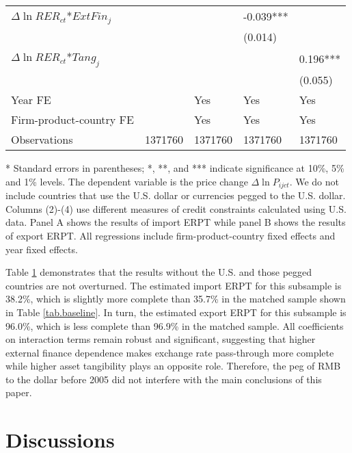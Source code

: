 \documentclass[12pt]{article}
\begin{document}
\begin{table}[htbp]
\begin{threeparttable}
\begin{tabular}{lllll}
		$\Delta \ln RER_{ct}$*$ExtFin_{j}$ &       &       & -0.039*** &  \\
		&       &       & (0.014) &  \\
		$\Delta \ln RER_{ct}$*$Tang_{j}$ &       &       &       & 0.196*** \\
		&       &       &       & (0.055) \\
		Year FE  &       & Yes   & Yes   & Yes \\
		Firm-product-country FE &       & Yes   & Yes   & Yes \\
		Observations & 1371760 & 1371760 & 1371760 & 1371760 \\
		\bottomrule
	\end{tabular}
	\begin{tablenotes}
		\footnotesize
		\item[*] Standard errors in parentheses; *, **, and *** indicate significance at 10\%, 5\% and 1\% levels. The dependent variable is the price change $\Delta \ln P_{ijct}$. We do not include countries that use the U.S. dollar or currencies pegged to the U.S. dollar. Columns (2)-(4) use different measures of credit constraints calculated using U.S. data. Panel A shows the results of import ERPT while panel B shows the results of export ERPT. All regressions include firm-product-country fixed effects and year fixed effects.
	\end{tablenotes}
        \end{threeparttable}
        \label{tab.alt.nopeg}
\end{table}

Table \ref{tab.alt.nopeg} demonstrates that the results without the U.S. and those pegged countries are not overturned. The estimated import ERPT for this subsample is 38.2\%, which is slightly more complete than 35.7\% in the matched sample shown in Table \ref{tab.baseline}. In turn, the estimated export ERPT for this subsample is 96.0\%, which is less complete than 96.9\% in the matched sample. All coefficients on interaction terms remain robust and significant, suggesting that higher external finance dependence makes exchange rate pass-through more complete while higher asset tangibility plays an opposite role. Therefore, the peg of RMB to the dollar before 2005 did not interfere with the main conclusions of this paper.

\section{Discussions} \label{Discussion}
\end{document}
